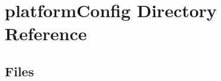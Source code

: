 \section{platform\+Config Directory Reference}
\label{dir_11edeae61dd8f24b925bb8edf08a2167}
\subsection*{Files}
\begin{DoxyCompactItemize}
\end{DoxyCompactItemize}
